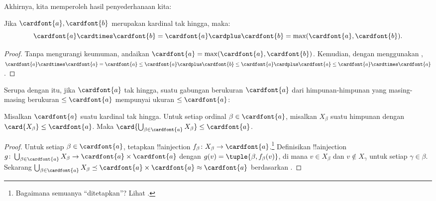 \documentclass[../../../include/open-logic-section]{subfiles}
\begin{document}
Akhirnya, kita memperoleh hasil penyederhanaan kita:

\begin{thm}
Jika $\cardfont{a}, \cardfont{b}$ merupakan kardinal tak hingga, maka:
\[
	\cardfont{a}
\cardtimes \cardfont{b} = \cardfont{a} \cardplus \cardfont{b} =
\text{max}(\cardfont{a}, \cardfont{b}).
\]
\end{thm}

\begin{proof}
Tanpa mengurangi keumuman, andaikan
$\cardfont{a} = \max(\cardfont{a}, \cardfont{b})$. Kemudian, dengan
menggunakan ,
$\cardfont{a}\cardtimes\cardfont{a} = \cardfont{a} \leq \cardfont{a}
\cardplus \cardfont{b} \leq \cardfont{a} \cardplus \cardfont{a} \leq
\cardfont{a} \cardtimes \cardfont{a}$. \end{proof}\noindent Serupa dengan
itu, jika $\cardfont{a}$ tak hingga, suatu gabungan berukuran
$\cardfont{a}$ dari himpunan-himpunan yang masing-masing berukuran
$\leq\cardfont{a}$ mempunyai ukuran $\leq\cardfont{a}$:

\begin{prop}
Misalkan $\cardfont{a}$ suatu kardinal tak hingga. Untuk setiap ordinal
$\beta \in \cardfont{a}$, misalkan $X_\beta$ suatu himpunan dengan
$\card{X_\beta} \leq \cardfont{a}$. Maka
$\card{\bigcup_{\beta \in \cardfont{a}} X_\beta} \leq \cardfont{a}$.
\end{prop}

\begin{proof}
Untuk setiap $\beta \in \cardfont{a}$, tetapkan !!a{injection}
$f_\beta \colon X_\beta \to \cardfont{a}$.\footnote{Bagaimana semuanya
``ditetapkan''? Lihat .} Definisikan
!!a{injection} $g \colon
\bigcup_{\beta \in \cardfont{a}} X_\beta \to \cardfont{a} \times
\cardfont{a}$ dengan $g(v) = \tuple{\beta, f_\beta(v)}$, di mana
$v \in X_\beta$ dan $v \notin X_\gamma$ untuk setiap
$\gamma \in \beta$. Sekarang
$\bigcup_{\beta \in \cardfont{a}} X_\beta \preceq \cardfont{a} \times
\cardfont{a} \approx \cardfont{a}$ berdasarkan
.
\end{proof}
\end{document}
